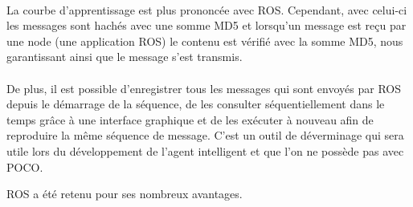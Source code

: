 \paragraph{}La courbe d’apprentissage est plus prononcée avec ROS. Cependant, avec celui-ci les messages sont hachés avec une somme MD5 et lorsqu’un message est reçu par une node (une application ROS) le contenu est vérifié avec la somme MD5, nous garantissant ainsi que le message s’est transmis.

\paragraph{}De plus, il est possible d’enregistrer tous les messages qui sont envoyés par ROS depuis le démarrage de la séquence, de les consulter séquentiellement dans le temps grâce à une interface graphique et de les exécuter à nouveau afin de reproduire la même séquence de message. C’est un outil de déverminage qui sera utile lors du développement de l’agent intelligent et que l’on ne possède pas avec POCO.

ROS a été retenu pour ses nombreux avantages. 